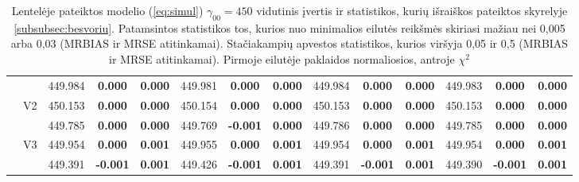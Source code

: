 \documentclass[12pt,a4paper]{article}
\begin{document}
\begin{sidewaystable}[H]
{\begin{tabular}{cc|ccc|ccc|ccc|ccc|}
   &  & 449.984 & \textbf{0.000} & \textbf{0.000} & 449.981 & \textbf{0.000} & \textbf{0.000} & 449.984 & \textbf{0.000} & \textbf{0.000} & 449.983 & \textbf{0.000} & \textbf{0.000} \\ 
   & \multirow{2}{*}{V2} & 450.153 & \textbf{0.000} & \textbf{0.000} & 450.154 & \textbf{0.000} & \textbf{0.000} & 450.153 & \textbf{0.000} & \textbf{0.000} & 450.153 & \textbf{0.000} & \textbf{0.000} \\ 
   &  & 449.785 & \textbf{0.000} & \textbf{0.000} & 449.769 & \textbf{-0.001} & \textbf{0.000} & 449.786 & \textbf{0.000} & \textbf{0.000} & 449.785 & \textbf{0.000} & \textbf{0.000} \\ 
   & \multirow{2}{*}{V3} & 449.954 & \textbf{0.000} & \textbf{0.001} & 449.955 & \textbf{0.000} & \textbf{0.001} & 449.954 & \textbf{0.000} & \textbf{0.001} & 449.954 & \textbf{0.000} & \textbf{0.001} \\ 
   &  & 449.391 & \textbf{-0.001} & \textbf{0.001} & 449.426 & \textbf{-0.001} & \textbf{0.001} & 449.391 & \textbf{-0.001} & \textbf{0.001} & 449.390 & \textbf{-0.001} & \textbf{0.001} \\ 
   \hline
\end{tabular}
}
\caption{Lentelėje pateiktos modelio (\ref{eq:simul}) $\gamma_{00}=450$ vidutinis įvertis ir statistikos, kurių išraiškos pateiktos skyrelyje \ref{subsubsec:besvoriu}. Patamsintos statistikos tos, kurios nuo minimalios eilutės reikšmės skiriasi mažiau nei 0,005 arba 0,03 (MRBIAS ir MRSE atitinkamai). Stačiakampių apvestos statistikos, kurios viršyja 0,05 ir 0,5 (MRBIAS ir MRSE atitinkamai). Pirmoje eilutėje paklaidos normaliosios, antroje $\chi^2$}
\end{sidewaystable}
\end{document}
